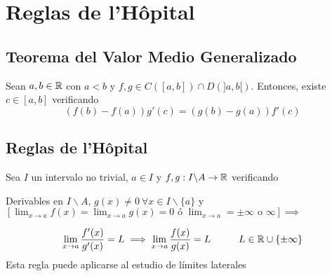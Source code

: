 \section{Reglas de l'Hôpital}
\subsection{Teorema del Valor Medio Generalizado}
Sean $a,b\in\mathbb{R}$ con $a<b$ y $f,g\in C([a,b])\cap D(]a,b[)$. Entonces, existe $c\in[a,b]$ verificando
$$ (f(b)-f(a))g'(c) = (g(b)-g(a))f'(c) $$
\subsection{Reglas de l'Hôpital}
Sea $I$ un intervalo no trivial, $a\in I$ y $f,g:I\backslash A\rightarrow\mathbb{R}$ verificando
\begin{center}
Derivables en $I\backslash A$, $g(x)\not = 0 \ \forall x\in I\backslash \{a\}$ y $[\lim_{x\rightarrow a} f(x) = \lim_{x\rightarrow a} g(x) = 0 \text{ ó } \lim_{x\rightarrow a} = \pm\infty \text{ o } \infty]\implies$
\end{center}
$$ \lim_{x\rightarrow a} \frac{f'(x)}{g'(x)}=L\implies \lim_{x\rightarrow a} \frac{f(x)}{g(x)}= L\hspace{1cm} L\in\mathbb{R}\cup\{\pm\infty\}$$
Esta regla puede aplicarse al estudio de límites laterales